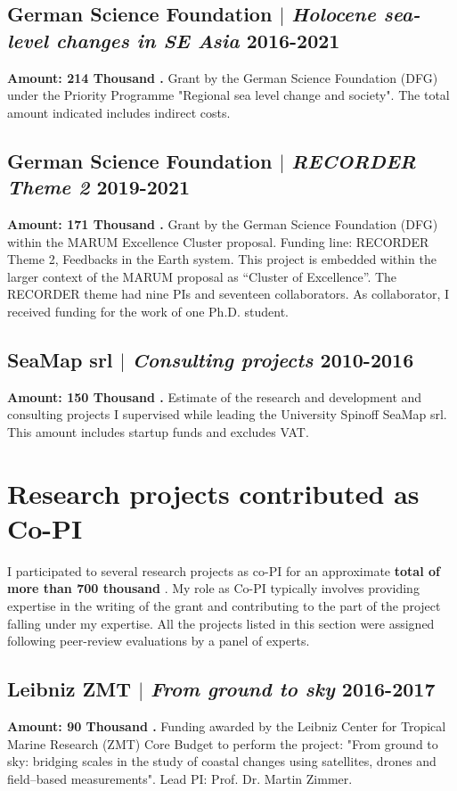 \documentclass[11pt]{article}
\begin{document}
\subsection{German Science Foundation  $|$ {\normalfont\textit{Holocene sea-level changes in SE Asia}} \hfill 2016-2021}
{\footnotesize \textbf{Amount: 214 Thousand \texteuro.} Grant by the German Science Foundation (DFG) under the Priority Programme "Regional sea level change and society". The total amount indicated includes indirect costs.}
\bigskip

\subsection{German Science Foundation  $|$ {\normalfont\textit{RECORDER Theme 2}} \hfill 2019-2021}
{\footnotesize \textbf{Amount: 171 Thousand \texteuro.} Grant by the German Science Foundation (DFG) within the MARUM Excellence Cluster proposal. Funding line: RECORDER Theme 2,  Feedbacks in the Earth system. This project is embedded within the larger context of the MARUM proposal as “Cluster of Excellence”. The RECORDER theme had nine PIs and seventeen collaborators. As collaborator, I received funding for the work of one Ph.D. student.}
\bigskip

\subsection{SeaMap srl  $|$ {\normalfont\textit{Consulting projects}} \hfill 2010-2016}
{\footnotesize \textbf{Amount: 150 Thousand \texteuro.} Estimate of the research and development and consulting projects I supervised while leading the University Spinoff SeaMap srl. This amount includes startup funds and excludes VAT.}
\bigskip

\newpage
\section{Research projects contributed as Co-PI}
{\normalfont I participated to several research projects as co-PI  for an approximate \textbf{total of more than 700 thousand \texteuro}. My role as Co-PI typically involves providing expertise in the writing of the grant and contributing to the part of the project falling under my expertise. All the projects listed in this section were assigned following peer-review evaluations by a panel of experts.}\\
\bigskip

\subsection{Leibniz ZMT  $|$ {\normalfont\textit{From ground to sky}} \hfill 2016-2017}
{\footnotesize \textbf{Amount: 90 Thousand \texteuro.}  Funding awarded by the Leibniz Center for Tropical Marine Research (ZMT) Core Budget to perform the project: "From ground to sky: bridging scales in the study of coastal changes using satellites, drones and field–based measurements". Lead PI: Prof. Dr. Martin Zimmer.}
\bigskip
\end{document}
